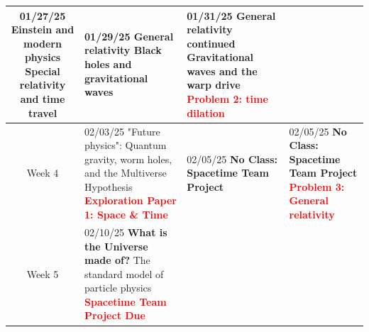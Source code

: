 \documentclass[11pt]{article}
\begin{document}
\begin{tabularx}{\textwidth}{|c|X|X|X|}
    01/27/25 \newline
    \newline
    Einstein and modern physics \newline
    Special relativity and time travel &
    
    01/29/25 \newline
    \newline
    General relativity \newline
    Black holes and gravitational waves&

    01/31/25  \newline
    \newline
    General relativity continued \newline
    Gravitational waves and the warp drive\newline
    \textcolor{red}{\textbf{Problem 2: time dilation}}\\
    
    \hline
    Week 4 & 
    
    02/03/25 \newline
    \newline
    "Future physics": Quantum gravity, worm   \newline
    holes, and the Multiverse Hypothesis \newline
    \textcolor{red}{\textbf{Exploration Paper 1: Space \& Time}} &
    
    \cellcolor{gray!20}02/05/25 \newline
    \newline
    \textbf{No Class: Spacetime Team Project} \newline
    \newline
    &

    \cellcolor{gray!20}02/05/25 \newline
    \newline
    \textbf{No Class: Spacetime Team Project}\newline\newline    
    \textcolor{red}{\textbf{Problem 3: General relativity}} \\


    \hline
    Week 5 & 
    
    02/10/25 \newline
    \textbf{What is the Universe made of?}\newline
    The standard model of particle physics \newline\newline
    \textcolor{red}{\textbf{Spacetime Team Project Due}} &
    

\end{tabularx}
\end{document}
